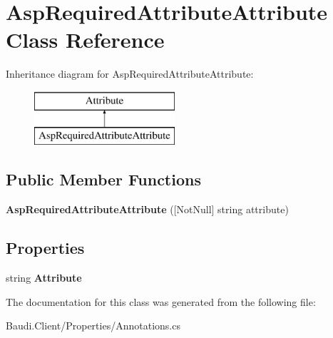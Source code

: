 \hypertarget{class_asp_required_attribute_attribute}{}\section{Asp\+Required\+Attribute\+Attribute Class Reference}
\label{class_asp_required_attribute_attribute}
Inheritance diagram for Asp\+Required\+Attribute\+Attribute\+:\begin{figure}[H]
\begin{center}
\leavevmode
\includegraphics[height=2.000000cm]{class_asp_required_attribute_attribute}
\end{center}
\end{figure}
\subsection*{Public Member Functions}
\begin{DoxyCompactItemize}
\item 
\hypertarget{class_asp_required_attribute_attribute_a37e197f5a5990c0140d0dc75be9ad6a6}{}{\bfseries Asp\+Required\+Attribute\+Attribute} (\mbox{[}Not\+Null\mbox{]} string attribute)\label{class_asp_required_attribute_attribute_a37e197f5a5990c0140d0dc75be9ad6a6}

\end{DoxyCompactItemize}
\subsection*{Properties}
\begin{DoxyCompactItemize}
\item 
\hypertarget{class_asp_required_attribute_attribute_a8d782b24a958ba36ee4d63265a5db96d}{}string {\bfseries Attribute}\label{class_asp_required_attribute_attribute_a8d782b24a958ba36ee4d63265a5db96d}

\end{DoxyCompactItemize}


The documentation for this class was generated from the following file\+:\begin{DoxyCompactItemize}
\item 
Baudi.\+Client/\+Properties/Annotations.\+cs\end{DoxyCompactItemize}
